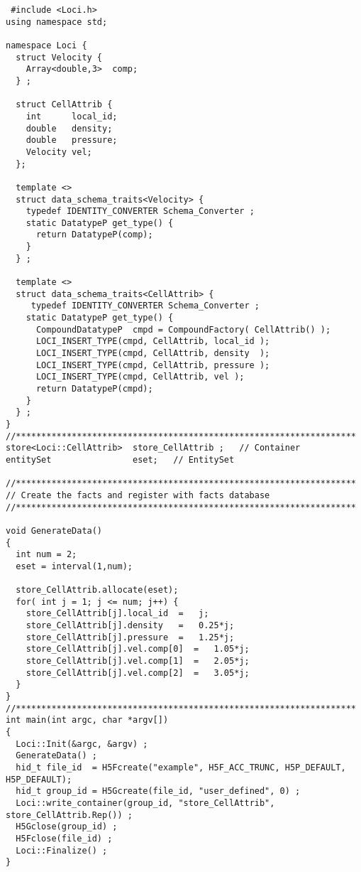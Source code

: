 \begin{verbatim}
 #include <Loci.h>
using namespace std;

namespace Loci {
  struct Velocity {
    Array<double,3>  comp;
  } ;
  
  struct CellAttrib {
    int      local_id;
    double   density;
    double   pressure;
    Velocity vel;
  };
  
  template <>
  struct data_schema_traits<Velocity> {
    typedef IDENTITY_CONVERTER Schema_Converter ;
    static DatatypeP get_type() {
      return DatatypeP(comp);
    }
  } ;
  
  template <>
  struct data_schema_traits<CellAttrib> {
     typedef IDENTITY_CONVERTER Schema_Converter ;
    static DatatypeP get_type() {
      CompoundDatatypeP  cmpd = CompoundFactory( CellAttrib() );
      LOCI_INSERT_TYPE(cmpd, CellAttrib, local_id );
      LOCI_INSERT_TYPE(cmpd, CellAttrib, density  );
      LOCI_INSERT_TYPE(cmpd, CellAttrib, pressure );
      LOCI_INSERT_TYPE(cmpd, CellAttrib, vel );
      return DatatypeP(cmpd);
    }
  } ;
}
//*******************************************************************
store<Loci::CellAttrib>  store_CellAttrib ;   // Container
entitySet                eset;   // EntitySet

//*******************************************************************
// Create the facts and register with facts database
//*******************************************************************

void GenerateData()
{
  int num = 2;
  eset = interval(1,num);
  
  store_CellAttrib.allocate(eset);
  for( int j = 1; j <= num; j++) {
    store_CellAttrib[j].local_id  =   j;
    store_CellAttrib[j].density   =   0.25*j;
    store_CellAttrib[j].pressure  =   1.25*j;
    store_CellAttrib[j].vel.comp[0]  =   1.05*j;
    store_CellAttrib[j].vel.comp[1]  =   2.05*j;
    store_CellAttrib[j].vel.comp[2]  =   3.05*j;
  }
}
//*******************************************************************
int main(int argc, char *argv[])
{
  Loci::Init(&argc, &argv) ;
  GenerateData() ;
  hid_t file_id  = H5Fcreate("example", H5F_ACC_TRUNC, H5P_DEFAULT, H5P_DEFAULT);
  hid_t group_id = H5Gcreate(file_id, "user_defined", 0) ;
  Loci::write_container(group_id, "store_CellAttrib", store_CellAttrib.Rep()) ; 
  H5Gclose(group_id) ;
  H5Fclose(file_id) ;
  Loci::Finalize() ;
}

\end{verbatim}
